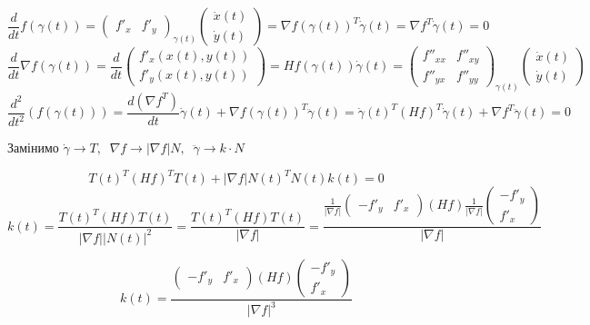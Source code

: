 \documentclass[10pt, a4paper]{article} %
\begin{document}
\[\frac{d}{dt}f(\gamma(t)) = \begin{pmatrix}f'_x & f'_y\end{pmatrix}_{\gamma(t)} \begin{pmatrix}\dot x(t) \\ \dot y(t)\end{pmatrix} = \nabla f(\gamma(t))^T \dot \gamma(t) = \nabla f^T\dot \gamma(t) = 0\]
\[\frac{d}{dt}\nabla f(\gamma(t)) = \frac{d}{dt} \begin{pmatrix}
        f'_x(x(t), y(t)) \\ f'_y(x(t), y(t))
    \end{pmatrix} = Hf(\gamma(t)) \dot \gamma(t) = \begin{pmatrix}
        f''_{xx} & f''_{xy} \\ f''_{yx} & f''_{yy}
    \end{pmatrix}_{\gamma(t)}\begin{pmatrix}
        \dot x(t) \\ \dot y(t)
    \end{pmatrix}
\]
\[\frac{d^2}{dt^2}(f(\gamma(t))) = \frac{d(\nabla f^T)}{dt} \dot \gamma(t) + \nabla f(\gamma(t))^T \ddot \gamma(t) = \dot \gamma(t)^T (Hf)^T \dot \gamma(t) + \nabla f^T \ddot \gamma(t) = 0\]

Замінимо $\dot\gamma \to T, \;\; \nabla f \to |\nabla f|N, \;\; \ddot \gamma \to k \cdot N$

\[T(t)^T (Hf)^T T(t) + |\nabla f|N(t)^T N(t) k(t) = 0\]
\[k(t) = \frac{T(t)^T (Hf) T(t)}{|\nabla f||N(t)|^2} = \frac{T(t)^T (Hf) T(t)}{|\nabla f|} = \frac{\frac{1}{|\nabla f|}\begin{pmatrix}-f'_y & f'_x\end{pmatrix} (Hf) \frac{1}{|\nabla f|}\begin{pmatrix}-f'_y \\ f'_x\end{pmatrix}}{|\nabla f|} \]

\[k(t) = \frac{\begin{pmatrix}-f'_y & f'_x\end{pmatrix} (Hf) \begin{pmatrix}-f'_y \\ f'_x\end{pmatrix}}{|\nabla f|^3} \]



\end{document}
